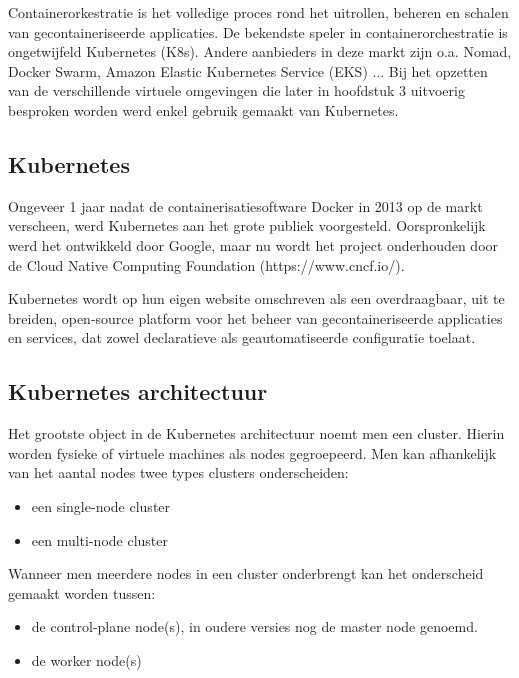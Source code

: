 Containerorkestratie is het volledige proces rond het uitrollen, beheren en schalen van gecontaineriseerde applicaties. De bekendste speler in containerorchestratie is ongetwijfeld Kubernetes (K8s). Andere aanbieders in deze markt zijn o.a. Nomad, Docker Swarm, Amazon Elastic Kubernetes Service (EKS) ...
Bij het opzetten van de verschillende virtuele omgevingen die later in hoofdstuk 3 uitvoerig besproken worden werd enkel gebruik gemaakt van Kubernetes.

\subsection{Kubernetes} 

Ongeveer 1 jaar nadat de containerisatiesoftware Docker in 2013 op de markt verscheen, werd Kubernetes aan het grote publiek voorgesteld. Oorspronkelijk werd het ontwikkeld door Google, maar nu wordt het project onderhouden door de Cloud Native Computing Foundation (https://www.cncf.io/).

Kubernetes wordt op hun eigen website omschreven als een overdraagbaar, uit te breiden, open-source platform voor het beheer van gecontaineriseerde applicaties en services, dat zowel declaratieve als geautomatiseerde configuratie toelaat.

\subsection{Kubernetes architectuur}

Het grootste object in de Kubernetes architectuur noemt men een cluster. Hierin worden fysieke of virtuele machines als nodes gegroepeerd. Men kan afhankelijk van het aantal nodes twee types clusters onderscheiden:

\begin{itemize}
    \item een single-node cluster 
    \item een multi-node cluster 
\end{itemize} 

Wanneer men meerdere nodes in een cluster onderbrengt kan het onderscheid gemaakt worden tussen:

\begin{itemize}
    \item de control-plane node(s), in oudere versies nog de master node genoemd.
    \item de worker node(s)
\end{itemize} 

